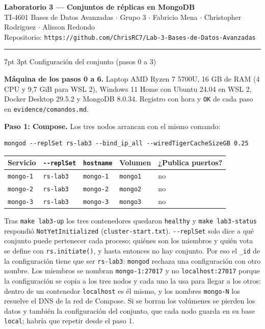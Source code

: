 \documentclass[10pt,letterpaper]{article}
\makeatletter
\renewcommand\section{\@startsection{section}{1}{\z@}%
  {7pt \@plus 2pt \@minus 1pt}{3pt}%
  {\normalfont\normalsize\bfseries\color{acc}}}
\makeatother
\begin{document}
{\LARGE\bfseries\color{acc} Laboratorio 3 --- Conjuntos de réplicas en MongoDB}\\[2pt]
{\footnotesize\color{gris} TI-4601 Bases de Datos Avanzadas $\cdot$ Grupo 3 $\cdot$ Fabricio Mena $\cdot$ Christopher Rodriguez $\cdot$ Alisson Redondo}\\
{\footnotesize\color{gris} Repositorio: \texttt{https://github.com/ChrisRC7/Lab-3-Bases-de-Datos-Avanzadas}}

\vspace{4pt}\hrule\vspace{6pt}

\section{Configuración del conjunto (pasos 0 a 3)}

\textbf{Máquina de los pasos 0 a 6.} Laptop AMD Ryzen 7 5700U, 16 GB de RAM (4 CPU y 9,7 GiB para WSL 2),
Windows 11 Home con Ubuntu 24.04 en WSL 2, Docker Desktop 29.5.2 y MongoDB 8.0.34. Registro con hora y
\texttt{OK} de cada paso en \texttt{evidence/comandos.md}.

\textbf{Paso 1: Compose.} Los tres nodos arrancan con el mismo comando:
\begin{Verbatim}
mongod --replSet rs-lab3 --bind_ip_all --wiredTigerCacheSizeGB 0.25
\end{Verbatim}

\begin{center}\footnotesize
\begin{tabular}{@{}lllll@{}}
\toprule
\textbf{Servicio} & \textbf{\texttt{-{}-replSet}} & \textbf{\texttt{hostname}} & \textbf{Volumen} & \textbf{¿Publica puertos?} \\
\midrule
\texttt{mongo-1} & \texttt{rs-lab3} & \texttt{mongo-1} & \texttt{mongo1} & no \\
\texttt{mongo-2} & \texttt{rs-lab3} & \texttt{mongo-2} & \texttt{mongo2} & no \\
\texttt{mongo-3} & \texttt{rs-lab3} & \texttt{mongo-3} & \texttt{mongo3} & no \\
\bottomrule
\end{tabular}
\end{center}

Tras \texttt{make lab3-up} los tres contenedores quedaron \texttt{healthy} y \texttt{make lab3-status}
respondió \texttt{NotYetInitialized} (\texttt{cluster-start.txt}).
\texttt{-{}-replSet} solo dice a qué conjunto puede pertenecer cada proceso; quiénes son los miembros y
quién vota se define con \texttt{rs.initiate()}, y hasta entonces no hay conjunto. Por eso el \texttt{\_id}
de la configuración tiene que ser \texttt{rs-lab3}: \texttt{mongod} rechaza una configuración con otro
nombre. Los miembros se nombran \texttt{mongo-1:27017} y no \texttt{localhost:27017} porque la
configuración se copia a los tres nodos y cada uno la usa para llegar a los otros: dentro de un contenedor
\texttt{localhost} es él mismo, y los nombres \texttt{mongo-N} los resuelve el DNS de la red de Compose.
Si se borran los volúmenes se pierden los datos y también la configuración del conjunto, que cada nodo
guarda en su base \texttt{local}; habría que repetir desde el paso 1.
\end{document}
